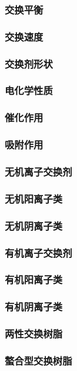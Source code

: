 \documentclass[UTF8]{../../ApplicationUniverse}
\begin{document}
            \subsubsection{交换平衡}
            \subsubsection{交换速度}
            \subsubsection{交换剂形状}
            \subsubsection{电化学性质}
            \subsubsection{催化作用}
            \subsubsection{吸附作用}
        \subsubsection{无机离子交换剂}
            \subsubsection{无机阳离子类}
            \subsubsection{无机阴离子类}
        \subsubsection{有机离子交换剂}
            \subsubsection{有机阳离子类}
            \subsubsection{有机阴离子类}
            \subsubsection{两性交换树脂}
            \subsubsection{螯合型交换树脂}
\end{document}
